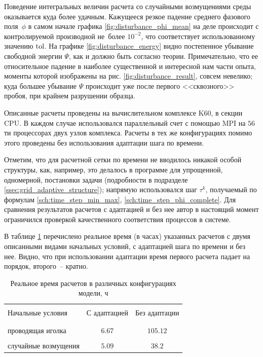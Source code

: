 Поведение интегральных величин расчета со случайными возмущениями среды оказывается куда более удачным. Кажущееся резкое падение среднего фазового поля~$\phi$ в самом начале графика \ref{fig:disturbance_phi_mean} на деле происходит с контролируемой производной не~более $10^{-2}$, что соответствует использованному значению ${\text{tol}}$. На графике \ref{fig:disturbance_energy} видно постепенное убывание свободной энергии $\Psi$, как и должно быть согласно теории. Примечательно, что ее относительное падение в наиболее существенной и интересной нам части опыта, моменты которой изображены на рис. \ref{fig:disturbance_result}, совсем невелико; куда большее убывание $\Psi$ происходит уже после первого <<сквозного>> пробоя, при крайнем разрушении образца.

Описанные расчеты проведены на вычислительном комплексе K60, в секции CPU. В каждом случае использовался параллельный счет с помощью MPI на $56$ти процессорах двух узлов комплекса. Расчеты в тех же конфигурациях помимо этого проведены без использования адаптации шага по времени.

Отметим, что для расчетной сетки по времени не вводилось никакой особой структуры, как, например, это делалось в программе для упрощенной, одномерной, постановки задачи (подробности в подразделе \ref{ssec:grid_adaptive_structure}); напрямую использовался шаг $\tau^k$, получаемый по формулам \eqref{sch:time_step_min_max}, \eqref{sch:time_step_phi_complete}. Для сравнения результатов расчетов с адаптацией и без нее автор в настоящий момент ограничился проверкой качественного соответствия процессов в системе.

В таблице \ref{tab:calculation_times} перечислено реальное время (в часах) указанных расчетов с двумя описанными видами начальных условий, с адаптацией шага по времени и без нее. Видно, что при использовании адаптации время первого расчета падает на порядок, второго~-- кратно.

\begin{table}[!t]
\captionsetup{justification=raggedright,singlelinecheck=false}
\caption[]{Реальное время расчетов в различных конфигурациях модели, ч}
\centering
\begin{tabular}{|l|c|c|}
    \hline
    && \\[-3.5mm]
    Начальные условия       & С адаптацией  & Без адаптации \\[-2mm]
    && \\[-2mm]
    \hline
    && \\[-3.5mm]
    проводящая иголка       & $6.67$        & $105.12$      \\[1mm]
    && \\[-3.5mm]
    случайные возмущения    & $5.09$        & $38.2$        \\[1mm]
    \hline
\end{tabular}
\label{tab:calculation_times}
\end{table}